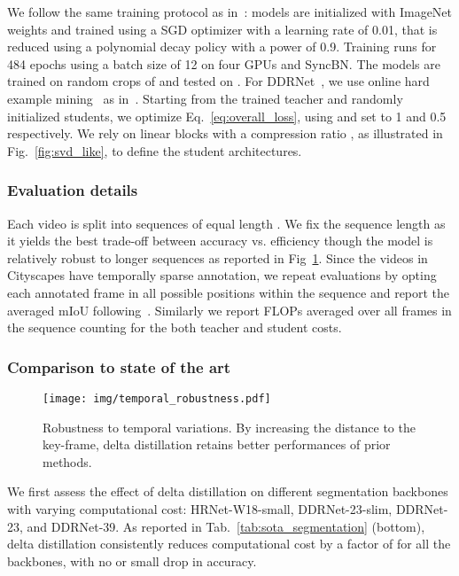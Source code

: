 \documentclass[runningheads]{llncs}
\begin{document}
We follow the same training protocol as in~\cite{ddrnet,hrnet}: models are initialized with ImageNet weights and trained using a SGD optimizer with a learning rate of 0.01, that is reduced using a polynomial decay policy with a power of 0.9. 
Training runs for 484 epochs using a batch size of 12 on four GPUs and SyncBN.
The models are trained on random crops of  and tested on . For DDRNet~\cite{ddrnet}, we use online hard example mining~\cite{shrivastava2016training} as in~\cite{ddrnet}.
Starting from the trained teacher and randomly initialized students, we optimize Eq.~\ref{eq:overall_loss}, using  and  set to 1 and 0.5 respectively.
We rely on linear blocks with a compression ratio , as illustrated in Fig.~\ref{fig:svd_like}, to define the student architectures.
\subsubsection{Evaluation details}
Each video is split into sequences of equal length . We fix the sequence length  as it yields the best trade-off between accuracy vs. efficiency though the model is relatively robust to longer sequences as reported in Fig~\ref{fig:temporal_robustness}.
Since the videos in Cityscapes have temporally sparse annotation, we repeat evaluations by opting each annotated frame in all possible positions within the sequence and report the averaged mIoU following~\cite{hu2020tdnet}. Similarly we report FLOPs averaged over all frames in the sequence counting for the both teacher and student costs.
\subsubsection{Comparison to state of the art}
\label{sec:segmentation_sota}
\begin{figure}[t]
\centering
\texttt{[image: img/temporal\_robustness.pdf]}
\caption{Robustness to temporal variations. By increasing the distance to the key-frame, delta distillation retains better performances of prior methods.}
\label{fig:temporal_robustness}
\vspace{-6mm}
\end{figure} We first assess the effect of delta distillation on different segmentation backbones with varying computational cost: HRNet-W18-small, DDRNet-23-slim, DDRNet-23, and DDRNet-39. 
As reported in Tab.~\ref{tab:sota_segmentation} (bottom), delta distillation consistently reduces computational cost by a factor of  for all the backbones, with no or small drop in accuracy.
\end{document}
